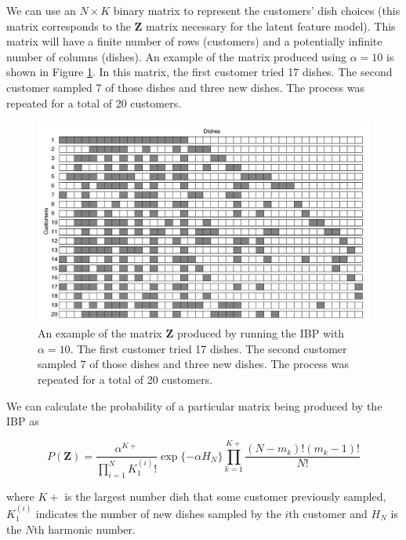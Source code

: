 \documentclass[twoside]{article}
\begin{document}
We can use an $N \times K$ binary matrix to represent the customers' dish choices (this matrix corresponds to the $\mathbf{Z}$ matrix necessary for the latent feature model). This matrix will have a finite number of rows (customers) and a potentially infinite number of columns (dishes).  An example of the matrix produced using $\alpha = 10$ is shown in Figure \ref{fig:ex}. In this matrix, the first customer tried 17 dishes. The second customer sampled 7 of those dishes and three new dishes. The process was repeated for a total of 20 customers.

\begin{figure}[h]
  \centering
  \includegraphics[scale=0.35]{ex}
  \caption{An example of the matrix $\mathbf{Z}$ produced by running the IBP with $\alpha = 10$. The first customer tried 17 dishes. The second customer sampled 7 of those dishes and three new dishes. The process was repeated for a total of 20 customers.}
  \label{fig:ex}
\end{figure}

We can calculate the probability of a particular matrix being produced by the IBP as

\begin{equation}
    P(\mathbf{Z}) = \frac{\alpha^{K+}}{\prod_{i = 1}^{N}K_1^{(i)}!} \exp\{-\alpha H_N\} \prod_{k = 1}^{K+} \frac{(N-m_k)!(m_k-1)!}{N!}
    \label{eq:ibp}
\end{equation}

where $K+$ is the largest number dish that some customer previously sampled, $K_1^{(i)}$ indicates the number of new dishes sampled by the $i$th customer and $H_N$ is the $N$th harmonic number.
\end{document}
